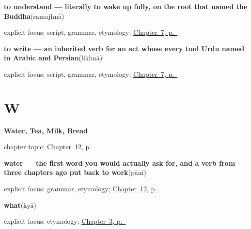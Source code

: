 \noindent\begin{minipage}[t]{\linewidth}
\raggedright
\textbf{to understand — literally to wake up fully, on the root that named the Buddha}\enspace\emph{}\enspace(samajhnā)\par
\footnotesize explicit focus: script, grammar, etymology; \hyperref[ch:ur-mind-verbs]{Chapter~7, p.~\pageref*{ch:ur-mind-verbs}}
\end{minipage}\par\smallskip

\noindent\begin{minipage}[t]{\linewidth}
\raggedright
\textbf{to write — an inherited verb for an act whose every tool Urdu named in Arabic and Persian}\enspace\emph{}\enspace(likhnā)\par
\footnotesize explicit focus: script, grammar, etymology; \hyperref[ch:ur-mind-verbs]{Chapter~7, p.~\pageref*{ch:ur-mind-verbs}}
\end{minipage}\par\smallskip

\section*{W}

\noindent\begin{minipage}[t]{\linewidth}
\raggedright
\textbf{Water, Tea, Milk, Bread}\par
\footnotesize chapter topic; \hyperref[ch:ur-food-words]{Chapter~12, p.~\pageref*{ch:ur-food-words}}
\end{minipage}\par\smallskip

\noindent\begin{minipage}[t]{\linewidth}
\raggedright
\textbf{water — the first word you would actually ask for, and a verb from three chapters ago put back to work}\enspace\emph{}\enspace(pānī)\par
\footnotesize explicit focus: grammar, etymology; \hyperref[ch:ur-food-words]{Chapter~12, p.~\pageref*{ch:ur-food-words}}
\end{minipage}\par\smallskip

\noindent\begin{minipage}[t]{\linewidth}
\raggedright
\textbf{what}\enspace\emph{}\enspace(kyā)\par
\footnotesize explicit focus: etymology; \hyperref[ch:ur-ask-and-answer-names]{Chapter~3, p.~\pageref*{ch:ur-ask-and-answer-names}}
\end{minipage}\par\smallskip

